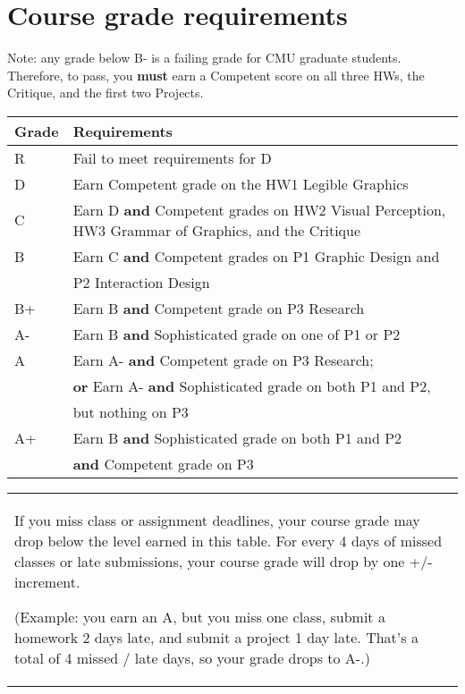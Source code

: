 \documentclass[12pt]{article}
\begin{document}
\begin{minipage}{\textwidth}
\section*{Course grade requirements}
Note: any grade below B- is a failing grade for CMU graduate students.
Therefore, to pass, you \textbf{must} earn a Competent score on all three HWs, the Critique, and the first two Projects. \\

\begin{tabular}{p{1in}p{4.5in}}
\textbf{Grade} & \textbf{Requirements} \\ \hline \hline
R & Fail to meet requirements for D \\ \hline
D & Earn Competent grade on the HW1 Legible Graphics \\ \hline
C & Earn D \textbf{and} Competent grades on HW2 Visual Perception, HW3 Grammar of Graphics, and the Critique \\ \hline
B & Earn C \textbf{and} Competent grades on P1 Graphic Design and \\ & P2 Interaction Design \\ \hline
B+ & Earn B \textbf{and} Competent grade on P3 Research\\ \hline
A- & Earn B \textbf{and} Sophisticated grade on one of P1 or P2 \\ \hline
A & Earn A- \textbf{and} Competent grade on P3 Research; \\ 
 & \textbf{or} Earn A- \textbf{and} Sophisticated grade on both P1 and P2, \\ & but nothing on P3 \\ \hline
A+ & Earn B \textbf{and} Sophisticated grade on both P1 and P2 \\ & \textbf{and} Competent grade on P3 \\ \hline \hline
\end{tabular}
\begin{tabular}{p{5.5in}}
If you miss class or assignment deadlines, your course grade may drop below the level earned in this table.
For every 4 days of missed classes or late submissions, your course grade will drop by one +/- increment.

(Example: you earn an A, but you miss one class, submit a homework 2 days late, and submit a project 1 day late. That's a total of 4 missed / late days, so your grade drops to A-.)
\end{tabular}
\end{minipage}
\end{document}
